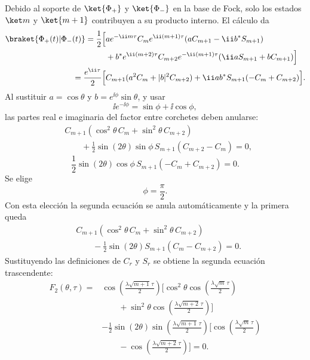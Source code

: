Debido al soporte de $\ket{\Phi_+}$ y $\ket{\Phi_-}$ en la base de Fock,
solo los estados $\ket m$ y $\ket{m+1}$ contribuyen a su producto interno.
El c\'alculo da
\begin{equation}
\begin{aligned}
  \braket{\Phi_+(t)|\Phi_-(t)}
  =\frac12\Big[&
  a e^{-\ii m\tau}C_m
  e^{\ii(m+1)\tau}
  (aC_{m+1}-\ii b^*S_{m+1})
  \\
  &+
  b^* e^{\ii(m+2)\tau}C_{m+2}
  e^{-\ii(m+1)\tau}
  (\ii aS_{m+1}+bC_{m+1})
  \Big]
  \\
  =\frac{e^{\ii\tau}}{2}\Big[&
  C_{m+1}(a^2C_m+|b|^2C_{m+2})
  +\ii ab^*S_{m+1}(-C_m+C_{m+2})
  \Big].
\end{aligned}
\end{equation}
Al sustituir $a=\cos\theta$ y $b=e^{\ii\phi}\sin\theta$, y usar
\begin{equation}
  \ii e^{-\ii\phi}=\sin\phi+\ii\cos\phi,
\end{equation}
las partes real e imaginaria del factor entre corchetes deben anularse:
\begin{equation}
\begin{aligned}
  &C_{m+1}
  \left(
  \cos^2\theta\,C_m
  +\sin^2\theta\,C_{m+2}
  \right)
  \\
  &\qquad+
  \frac12\sin(2\theta)\sin\phi\,
  S_{m+1}(C_{m+2}-C_m)=0,
\end{aligned}
\end{equation}
\begin{equation}
  \frac12\sin(2\theta)\cos\phi\,
  S_{m+1}(-C_m+C_{m+2})=0.
\end{equation}
Se elige
\begin{equation}
  \phi=\frac{\pi}{2}.
\end{equation}
Con esta elecci\'on la segunda ecuaci\'on se anula autom\'aticamente y la
primera queda
\begin{equation}
\begin{aligned}
  &C_{m+1}
  \left(
  \cos^2\theta\,C_m
  +\sin^2\theta\,C_{m+2}
  \right)
  \\
  &\qquad-
  \frac12\sin(2\theta)S_{m+1}(C_m-C_{m+2})=0.
\end{aligned}
\end{equation}
Sustituyendo las definiciones de $C_r$ y $S_r$ se obtiene la segunda
ecuaci\'on trascendente:
\begin{equation}
  \boxed{
  \begin{aligned}
  F_2(\theta,\tau)
  ={}&
  \cos\left(\frac{\lambda\sqrt{m+1}\,\tau}{2}\right)
  \Bigg[
  \cos^2\theta
  \cos\left(\frac{\lambda\sqrt m\,\tau}{2}\right)
  \\
  &\qquad+
  \sin^2\theta
  \cos\left(\frac{\lambda\sqrt{m+2}\,\tau}{2}\right)
  \Bigg]
  \\
  &-
  \frac12\sin(2\theta)
  \sin\left(\frac{\lambda\sqrt{m+1}\,\tau}{2}\right)
  \Bigg[
  \cos\left(\frac{\lambda\sqrt m\,\tau}{2}\right)
  \\
  &\qquad-
  \cos\left(\frac{\lambda\sqrt{m+2}\,\tau}{2}\right)
  \Bigg]
  =0.
  \end{aligned}
  }
\end{equation}

